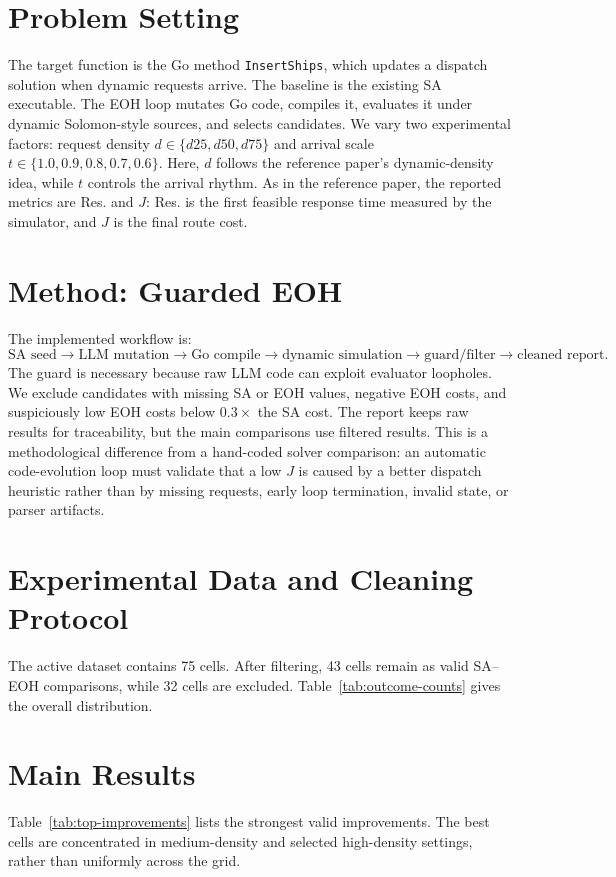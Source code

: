 \documentclass[11pt]{article}
\begin{document}
\section{Problem Setting}
The target function is the Go method \texttt{InsertShips}, which updates a dispatch solution when dynamic requests arrive. The baseline is the existing SA executable. The EOH loop mutates Go code, compiles it, evaluates it under dynamic Solomon-style sources, and selects candidates. We vary two experimental factors: request density \(d\in\{d25,d50,d75\}\) and arrival scale \(t\in\{1.0,0.9,0.8,0.7,0.6\}\). Here, \(d\) follows the reference paper's dynamic-density idea, while \(t\) controls the arrival rhythm. As in the reference paper, the reported metrics are Res. and \(J\): Res. is the first feasible response time measured by the simulator, and \(J\) is the final route cost.

\section{Method: Guarded EOH}
The implemented workflow is:
\[
\text{SA seed} \rightarrow \text{LLM mutation} \rightarrow \text{Go compile} \rightarrow \text{dynamic simulation} \rightarrow \text{guard/filter} \rightarrow \text{cleaned report}.
\]
The guard is necessary because raw LLM code can exploit evaluator loopholes. We exclude candidates with missing SA or EOH values, negative EOH costs, and suspiciously low EOH costs below \(0.3\times\) the SA cost. The report keeps raw results for traceability, but the main comparisons use filtered results. This is a methodological difference from a hand-coded solver comparison: an automatic code-evolution loop must validate that a low \(J\) is caused by a better dispatch heuristic rather than by missing requests, early loop termination, invalid state, or parser artifacts.

\section{Experimental Data and Cleaning Protocol}
The active dataset contains 75 cells. After filtering, 43 cells remain as valid SA--EOH comparisons, while 32 cells are excluded. Table~\ref{tab:outcome-counts} gives the overall distribution.



\section{Main Results}
Table~\ref{tab:top-improvements} lists the strongest valid improvements. The best cells are concentrated in medium-density and selected high-density settings, rather than uniformly across the grid.
\end{document}
